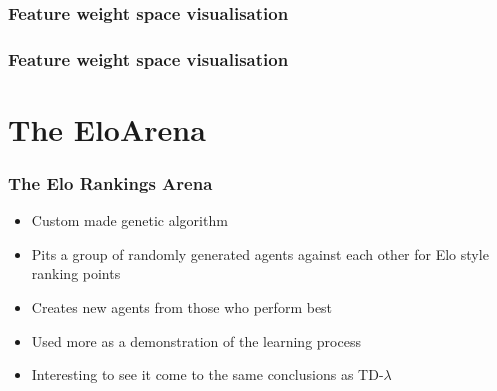 \documentclass[10pt]{beamer}
\begin{document}
\begin{frame}
  \frametitle{Feature weight space visualisation}
  \begin{center}   \end{center}
\end{frame}

\begin{frame}
  \frametitle{Feature weight space visualisation}
  \begin{center}   \end{center} 
\end{frame}



\section{The EloArena}

\begin{frame}
  \frametitle{The Elo Rankings Arena}
  \begin{itemize}
  \item<1-> Custom made genetic algorithm
  \item<1-> Pits a group of randomly generated agents against each other for Elo style ranking points
  \item<1-> Creates new agents from those who perform best
  \item<2-> Used more as a demonstration of the learning process
  \item<2-> Interesting to see it come to the same conclusions as TD-$\lambda$
  \end{itemize}
\end{frame}
\end{document}
